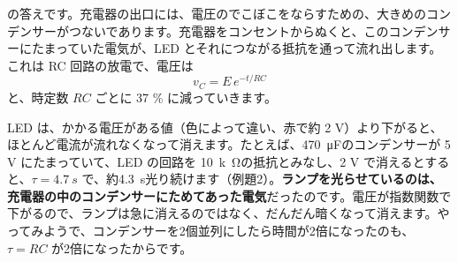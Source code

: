 \label{ph:電-9:sec5}
\noindent\begin{minipage}[c]{0.4\linewidth}\centering
{}
\label{ph:電-9:fig-charger}
\end{minipage}\hfill
\begin{minipage}[c]{0.57\linewidth}\raggedright
\label{ph:電-9:hatena}\bkhatenaref の答えです。充電器の出口には、電圧のでこぼこをならすための、大きめのコンデンサーがつないであります。充電器をコンセントからぬくと、このコンデンサーにたまっていた電気が、LED とそれにつながる抵抗を通って流れ出します。これは RC 回路の放電で、電圧は
\[ v_C=E\,e^{-t/RC} \]
と、時定数 $RC$ ごとに 37 \% に減っていきます。
\end{minipage}
\par\vspace{3pt}
LED は、かかる電圧がある値（色によって違い、赤で約 2 V）より下がると、ほとんど電流が流れなくなって消えます。たとえば、\qty{470}{\micro F}のコンデンサーが 5 V にたまっていて、LED の回路を \qty{10}{k\ohm}の抵抗とみなし、2 V で消えるとすると、$\tau=\qty{4.7}{s}$ で、約\qty{4.3}{s}光り続けます（例題2）。\textbf{ランプを光らせているのは、充電器の中のコンデンサーにためてあった電気}だったのです。電圧が指数関数で下がるので、ランプは急に消えるのではなく、だんだん暗くなって消えます。やってみようで、コンデンサーを2個並列にしたら時間が2倍になったのも、$\tau=RC$ が2倍になったからです。

